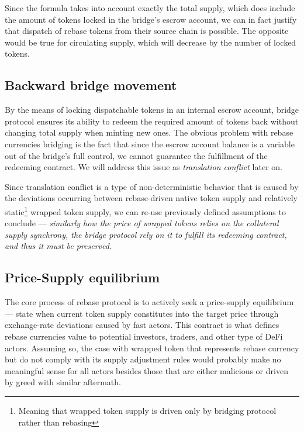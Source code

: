 \documentclass{article}
\begin{document}
Since the formula takes into account exactly the total supply, which does include the amount of tokens locked in the bridge's escrow account, we can in fact justify that dispatch of rebase tokens from their source chain is possible. The opposite would be true for circulating supply, which will decrease by the number of locked tokens.

\subsection{Backward bridge movement}

By the means of locking dispatchable tokens in an internal escrow account, bridge protocol ensures its ability to redeem the required amount of tokens back without changing total supply when minting new ones. The obvious problem with rebase currencies bridging is the fact that since the escrow account balance is a variable out of the bridge's full control, we cannot guarantee the fulfillment of the redeeming contract. We will address this issue as \textit{translation conflict} later on.

Since translation conflict is a type of non-deterministic behavior that is caused by the deviations occurring between rebase-driven native token supply and relatively static\footnote{Meaning that wrapped token supply is driven only by bridging protocol rather than rebasing} wrapped token supply, we can re-use previously defined assumptions to conclude --- \textit{similarly how the price of wrapped tokens relies on the collateral supply synchrony, the bridge protocol rely on it to fulfill its redeeming contract, and thus it must be preserved.}

\subsection{Price-Supply equilibrium}

The core process of rebase protocol is to actively seek a price-supply equilibrium --- state when current token supply constitutes into the target price through exchange-rate deviations caused by fast actors. This contract is what defines rebase currencies value to potential investors, traders, and other type of DeFi actors. Assuming so, the case with wrapped token that represents rebase currency but do not comply with its supply adjustment rules would probably make no meaningful sense for all actors besides those that are either malicious or driven by greed with similar aftermath.
\end{document}
